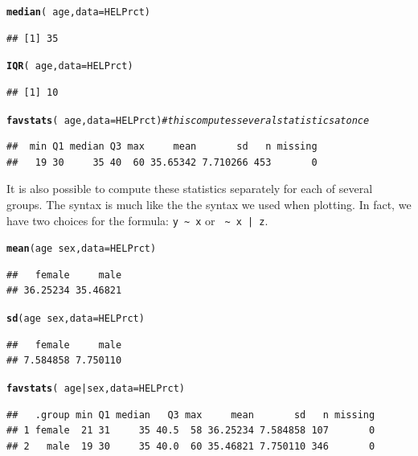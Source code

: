 \documentclass[twoside]{book}\usepackage[]{graphicx}\usepackage[]{xcolor}
\makeatletter
\newcommand{\hlcom}[1]{\textcolor[rgb]{0.678,0.584,0.686}{\textit{#1}}}%
\newcommand{\hlopt}[1]{\textcolor[rgb]{0,0,0}{#1}}%
\newcommand{\hlstd}[1]{\textcolor[rgb]{0.345,0.345,0.345}{#1}}%
\newcommand{\hlkwc}[1]{\textcolor[rgb]{0.333,0.667,0.333}{#1}}%
\newcommand{\hlkwd}[1]{\textcolor[rgb]{0.737,0.353,0.396}{\textbf{#1}}}%
\newenvironment{kframe}{%
 \def\at@end@of@kframe{}%
 \ifinner\ifhmode%
  \def\at@end@of@kframe{\end{minipage}}%
  \begin{minipage}{\columnwidth}%
 \fi\fi%
 \def\FrameCommand##1{\hskip\@totalleftmargin \hskip-\fboxsep
 \colorbox{shadecolor}{##1}\hskip-\fboxsep
     \hskip-\linewidth \hskip-\@totalleftmargin \hskip\columnwidth}%
 \MakeFramed {\advance\hsize-\width
   \@totalleftmargin\z@ \linewidth\hsize
   \@setminipage}}%
 {\par\unskip\endMakeFramed%
 \at@end@of@kframe}
\newenvironment{knitrout}{}{} %
\newcommand{\Rindex}[1]{\index{\texttt{#1}}}
\makeatother
\begin{document}
\Rindex{median()}%
\Rindex{IQR()}%
\Rindex{favstats()}%
\begin{knitrout}
\color{fgcolor}\begin{kframe}
\begin{alltt}
\hlkwd{median}\hlstd{(}\hlopt{~}\hlstd{age,} \hlkwc{data} \hlstd{= HELPrct)}
\end{alltt}
\begin{verbatim}
## [1] 35
\end{verbatim}
\begin{alltt}
\hlkwd{IQR}\hlstd{(}\hlopt{~}\hlstd{age,} \hlkwc{data} \hlstd{= HELPrct)}
\end{alltt}
\begin{verbatim}
## [1] 10
\end{verbatim}
\begin{alltt}
\hlkwd{favstats}\hlstd{(}\hlopt{~}\hlstd{age,} \hlkwc{data} \hlstd{= HELPrct)}  \hlcom{# this computes several statistics at once}
\end{alltt}
\begin{verbatim}
##  min Q1 median Q3 max     mean       sd   n missing
##   19 30     35 40  60 35.65342 7.710266 453       0
\end{verbatim}
\end{kframe}
\end{knitrout}

It is also possible to compute these statistics separately for each of several groups.
The syntax is much like the the syntax we used when plotting.  In fact, we have two 
choices for the formula:  \verb!y ~ x! or \verb! ~ x | z!.

\begin{knitrout}
\color{fgcolor}\begin{kframe}
\begin{alltt}
\hlkwd{mean}\hlstd{(age} \hlopt{~} \hlstd{sex,} \hlkwc{data} \hlstd{= HELPrct)}
\end{alltt}
\begin{verbatim}
##   female     male 
## 36.25234 35.46821
\end{verbatim}
\begin{alltt}
\hlkwd{sd}\hlstd{(age} \hlopt{~} \hlstd{sex,} \hlkwc{data} \hlstd{= HELPrct)}
\end{alltt}
\begin{verbatim}
##   female     male 
## 7.584858 7.750110
\end{verbatim}
\begin{alltt}
\hlkwd{favstats}\hlstd{(}\hlopt{~}\hlstd{age} \hlopt{|} \hlstd{sex,} \hlkwc{data} \hlstd{= HELPrct)}
\end{alltt}
\begin{verbatim}
##   .group min Q1 median   Q3 max     mean       sd   n missing
## 1 female  21 31     35 40.5  58 36.25234 7.584858 107       0
## 2   male  19 30     35 40.0  60 35.46821 7.750110 346       0
\end{verbatim}
\end{kframe}
\end{knitrout}
\end{document}

